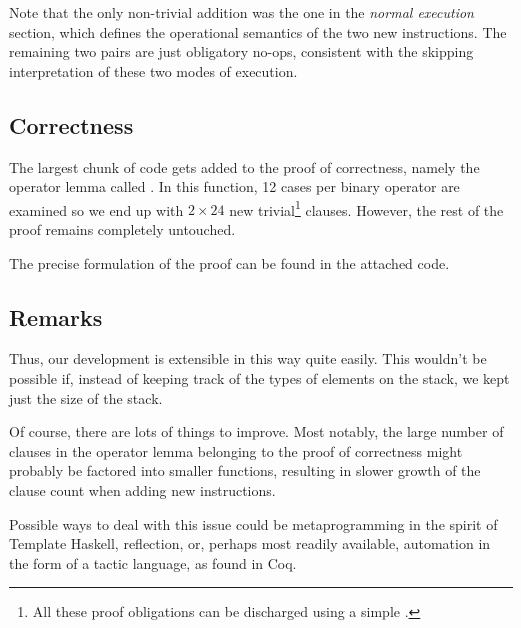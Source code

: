 Note that the only non-trivial addition was the one in the
\emph{normal execution} section, which defines the operational semantics of the
two new instructions. The remaining two pairs are just obligatory no-ops,
consistent with the skipping interpretation of these two modes of execution.

\subsection{Correctness}
\label{sec:lin-correctness}

The largest chunk of code gets added to the proof of correctness, namely the
operator lemma called . In this function, 12 cases per binary
operator are examined so we end up with $2 \times 24$ new trivial\footnote{All
these proof obligations can be discharged using a simple .}
clauses. However, the rest of the proof remains completely untouched.

The precise formulation of the proof can be found in the attached code.

\subsection{Remarks}

Thus, our development is extensible in this way quite easily. This wouldn't be
possible if, instead of keeping track of the types of elements on the stack, we
kept just the size of the stack.

Of course, there are lots of things to improve. Most notably, the large number
of clauses in the operator lemma belonging to the proof of correctness might
probably be factored into smaller functions, resulting in slower growth of
the clause count when adding new instructions.

Possible ways to deal with this issue could be metaprogramming in the spirit
of Template Haskell, reflection, or, perhaps most readily available, automation
in the form of a tactic language, as found in Coq.

